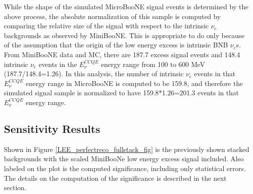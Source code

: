 While the shape of the simulated MicroBooNE signal events is determined by the above process, the absolute normalization of this sample is computed by comparing the relative size of the signal with respect to the intrinsic $\nu_e$ backgrounds as observed by MiniBooNE. This is appropriate to do only because of the assumption that the origin of the low energy excess is intrinsic BNB $\nu_e$s. From MiniBooNE data and MC, there are 187.7 excess signal events and 148.4 intrinsic $\nu_e$ events in the $E_\nu^{CCQE}$ energy range from 100 to 600 MeV (187.7/148.4=1.26). In this analysis, the number of intrinsic $\nu_e$ events in that $E_\nu^{CCQE}$ energy range in MicroBooNE is computed to be 159.8, and therefore the simulated signal sample is normalized to have 159.8*1.26=201.3 events in that $E_\nu^{CCQE}$ energy range.\\





















\subsection{Sensitivity Results}

Shown in Figure \ref{LEE_perfectreco_fullstack_fig} is the previously shown stacked backgrounds with the scaled MiniBooNe low energy excess signal included. Also labeled on the plot is the computed significance, including only statistical errors. The details on the computation of the significance is described in the next section.

